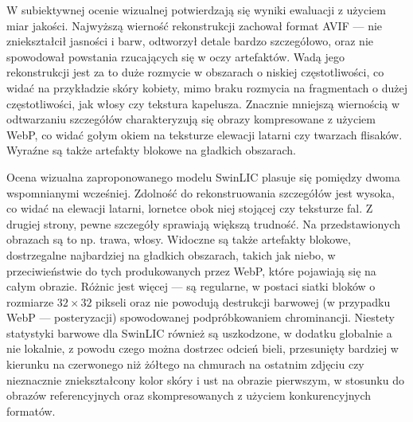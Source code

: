 W subiektywnej ocenie wizualnej potwierdzają się wyniki ewaluacji z użyciem miar jakości. Najwyższą wierność rekonstrukcji zachował format AVIF --- nie zniekształcił jasności i barw, odtworzył detale bardzo szczegółowo, oraz nie spowodował powstania rzucających się w oczy artefaktów. Wadą jego rekonstrukcji jest za to duże rozmycie w obszarach o niskiej częstotliwości, co widać na przykładzie skóry kobiety, mimo braku rozmycia na fragmentach o dużej częstotliwości, jak włosy czy tekstura kapelusza. Znacznie mniejszą wiernością w odtwarzaniu szczegółów charakteryzują się obrazy kompresowane z użyciem WebP, co widać gołym okiem na teksturze elewacji latarni czy twarzach flisaków. Wyraźne są także artefakty blokowe na gładkich obszarach.

Ocena wizualna zaproponowanego modelu SwinLIC plasuje się pomiędzy dwoma wspomnianymi wcześniej. Zdolność do rekonstruowania szczegółów jest wysoka, co widać na elewacji latarni, lornetce obok niej stojącej czy teksturze fal. Z drugiej strony, pewne szczegóły sprawiają większą trudność. Na przedstawionych obrazach są to np. trawa, włosy. Widoczne są także artefakty blokowe, dostrzegalne najbardziej na gładkich obszarach, takich jak niebo, w przeciwieństwie do tych produkowanych przez WebP, które pojawiają się na całym obrazie. Różnic jest więcej --- są regularne, w postaci siatki bloków o rozmiarze \( 32 \times 32 \) pikseli oraz nie powodują destrukcji barwowej (w przypadku WebP --- posteryzacji) spowodowanej podpróbkowaniem chrominancji. Niestety statystyki barwowe dla SwinLIC również są uszkodzone, w dodatku globalnie a nie lokalnie, z powodu czego można dostrzec odcień bieli, przesunięty bardziej w kierunku na czerwonego niż żółtego na chmurach na ostatnim zdjęciu czy nieznacznie zniekształcony kolor skóry i ust na obrazie pierwszym, w stosunku do obrazów referencyjnych oraz skompresowanych z użyciem konkurencyjnych formatów.

